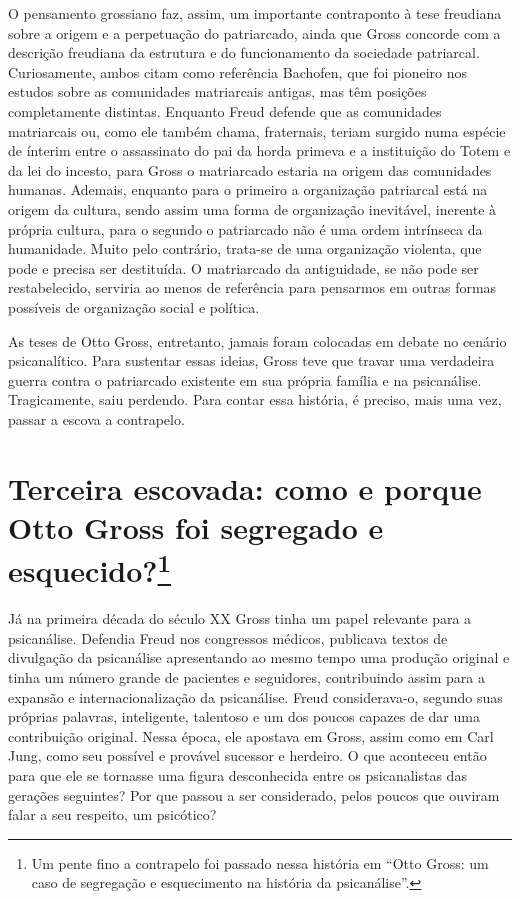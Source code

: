 O pensamento grossiano faz, assim, um importante contraponto à tese
freudiana sobre a origem e a perpetuação do patriarcado, ainda que Gross
concorde com a descrição freudiana da estrutura e do funcionamento da
sociedade patriarcal. Curiosamente, ambos citam como referência
Bachofen, que foi pioneiro nos estudos sobre as comunidades matriarcais
antigas, mas têm posições completamente distintas. Enquanto Freud
defende que as comunidades matriarcais ou, como ele também chama,
fraternais, teriam surgido numa espécie de ínterim entre o assassinato
do pai da horda primeva e a instituição do Totem e da lei do incesto,
para Gross o matriarcado estaria na origem das comunidades humanas.
Ademais, enquanto para o primeiro a organização patriarcal está na
origem da cultura, sendo assim uma forma de organização inevitável,
inerente à própria cultura, para o segundo o patriarcado não é uma ordem
intrínseca da humanidade. Muito pelo contrário, trata-se de uma
organização violenta, que pode e precisa ser destituída. O matriarcado
da antiguidade, se não pode ser restabelecido, serviria ao menos de
referência para pensarmos em outras formas possíveis de organização
social e política.

As teses de Otto Gross, entretanto, jamais foram colocadas em debate no
cenário psicanalítico. Para sustentar essas ideias, Gross teve que
travar uma verdadeira guerra contra o patriarcado existente em sua
própria família e na psicanálise. Tragicamente, saiu perdendo. Para
contar essa história, é preciso, mais uma vez, passar a escova a
contrapelo.

\section{Terceira escovada: como e porque Otto Gross foi segregado e
esquecido?\protect\footnote{\uppercase{U}m pente fino a contrapelo foi passado nessa
  história em ``\uppercase{O}tto \uppercase{G}ross: um caso de segregação e esquecimento na
  história da psicanálise''.}}

Já na primeira década do século XX Gross tinha um papel relevante para a
psicanálise. Defendia Freud nos congressos médicos, publicava textos de
divulgação da psicanálise apresentando ao mesmo tempo uma produção
original e tinha um número grande de pacientes e seguidores,
contribuindo assim para a expansão e internacionalização da psicanálise.
Freud considerava-o, segundo suas próprias palavras, inteligente,
talentoso e um dos poucos capazes de dar uma contribuição original.
Nessa época, ele apostava em Gross, assim como em Carl Jung, como seu
possível e provável sucessor e herdeiro. O que aconteceu então para que
ele se tornasse uma figura desconhecida entre os psicanalistas das
gerações seguintes? Por que passou a ser considerado, pelos poucos que
ouviram falar a seu respeito, um psicótico?


